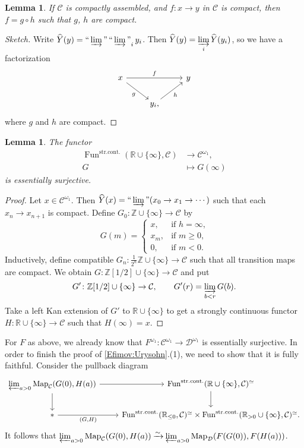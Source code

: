 \documentclass[draft]{amsart}
\newcommand{\ZZ}{\mathbb{Z}}
\newcommand{\RR}{\mathbb{R}}
\newcommand{\wh}[1]{\widehat{#1}}
\newcommand{\cat}[1]{\mathcal{#1}}
\newcommand{\isoto}{\mathbin{\xrightarrow{\sim}}}
\DeclareMathOperator{\Map}{Map}
\DeclareMathOperator{\Fun}{Fun}
\DeclareMathOperator*{\indinjlim}{\text{``}\varinjlim\text{''}} %
\newtheorem{lem}[thm]{Lemma}
\theoremstyle{definition}
\begin{document}
\begin{lem}
If $\cat C$ is compactly assembled, and $f\colon x\to y$ in $\cat C$ is compact, then $f = g\circ h$ such that $g$, $h$ are compact.
\end{lem}
\begin{proof}[Sketch]
Write $\wh{Y}(y)= \indinjlim\indinjlim_i y_i$. Then $\wh{Y}(y) = \varinjlim\limits_i \wh{Y}(y_i)$, so we have a factorization 
\[
\begin{tikzcd}
x \ar[rr,"f"] \ar[dr,"g"'] & & y \\
& y_i \ar[ur,"h"'],
\end{tikzcd}
\]
where $g$ and $h$ are compact.
\end{proof}

\begin{lem}
The functor
\begin{align*}
\Fun^{\mathrm{str.cont.}}(\RR\cup \{\infty\}, \cat C) &\to \cat C^{\omega_1}, \\
G &\mapsto G(\infty)
\end{align*}
is essentially surjective.
\end{lem}
\begin{proof}
Let $x \in \cat C^{\omega_1}$. Then $\wh{Y}(x) = \indinjlim (x_0\to x_1\to \dotsb)$ such that each $x_n \to x_{n+1}$ is compact. Define $G_0\colon \ZZ\cup \{\infty\} \to \cat C$ by
\[
G(m) = \begin{cases}
x, & \text{if $h=\infty$,}\\
x_m, & \text{if $m\ge0$,} \\
0, & \text{if $m<0$.}
\end{cases}
\]
Inductively, define compatible $G_n\colon \frac1{2^n}\ZZ\cup\{\infty\} \to \cat C$ such that all transition maps are compact. We obtain $G\colon \ZZ[1/2] \cup\{\infty\} \to \cat C$ and put
\[
G'\colon \ZZ[1/2] \cup\{\infty\} \to \cat C, \qquad G'(r) = \varinjlim\limits_{b<r} G(b).
\]
Take a left Kan extension of $G'$ to $\RR\cup\{\infty\}$ to get a strongly continuous functor $H\colon \RR\cup \{\infty\} \to \cat C$ such that $H(\infty) = x$.
\end{proof}

For $F$ as above, we already know that $F^{\omega_1}\colon \cat C^{\omega_1} \to \cat D^{\omega_1}$ is essentially surjective. In order to finish the proof of \cref{Efimov:Urysohn}.(1), we need to show that it is fully faithful. Consider the pullback diagram
\[
\begin{tikzcd}
\varprojlim_{a>0} \Map_{\cat C}(G(0), H(a)) \ar[r] \ar[d] & \Fun^{\mathrm{str.cont.}} (\RR\cup \{\infty\}, \cat C)^{\simeq} \ar[d] \\
* \ar[r,"{(G,H)}"'] & \Fun^{\mathrm{str.cont.}}(\RR_{\le0}, \cat C)^{\simeq} \times \Fun^{\mathrm{str.cont.}}(\RR_{>0}\cup \{\infty\}, \cat C)^{\simeq}.
\end{tikzcd}
\]
It follows that $\varprojlim_{a>0} \Map_{\cat C}(G(0), H(a)) \isoto \varprojlim_{a>0} \Map_{\cat D}(F(G(0)), F(H(a)))$.
\end{document}

